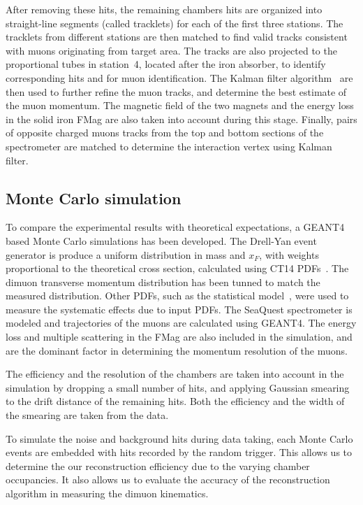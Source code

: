 \documentclass[reprint,aps,unsortedaddress,superscriptaddress,prc,floatfix,showpacs,linenumbers,final]{revtex4-2}
\begin{document}
After removing these hits, the remaining chambers hits are organized into straight-line segments (called tracklets)
for each of the first three stations.
The tracklets from different stations are then matched to find valid tracks consistent with muons 
originating from target area. 
The tracks are also projected to the proportional tubes in station~4, located after the iron absorber,
to identify corresponding hits and for muon identification.
The Kalman filter algorithm~\cite{kalman1960} are then used to further refine the muon tracks,
and determine the best estimate of the muon momentum.
The magnetic field of the two magnets and the energy loss in the solid iron FMag are also taken into account during this stage.
Finally, pairs of opposite charged muons tracks from the top and bottom sections of the spectrometer are
matched to determine the interaction vertex using Kalman filter.

\subsection{Monte Carlo simulation}
\label{subsec:MC}

To compare the experimental results with theoretical expectations,
a GEANT4~\cite{agostinelli2003,allison2006,allison2016} based Monte Carlo simulations has been developed.
The Drell-Yan event generator is produce a uniform distribution in mass and $x_F$,
with weights proportional to the theoretical cross section, calculated using CT14 PDFs~\cite{hou2018}.
The dimuon transverse momentum distribution has been tunned to match the measured distribution.
Other PDFs, such as the statistical model~\cite{soffer2019}, were used to measure the systematic effects due to input PDFs.
The SeaQuest spectrometer is modeled and trajectories of the muons are calculated using GEANT4.
The energy loss and multiple scattering in the FMag are also included in the simulation,
and are the dominant factor in determining the momentum resolution of the muons. 

The efficiency and the resolution of the chambers are taken into account in the simulation
by dropping a small number of hits, and applying Gaussian smearing to the drift distance of the remaining hits.
Both the efficiency and the width of the smearing are taken from the data.

To simulate the noise and background hits during data taking,
each Monte Carlo events are embedded with hits recorded by the random trigger.
This allows us to determine the our reconstruction efficiency due to the varying chamber occupancies.
It also allows us to evaluate the accuracy of the reconstruction algorithm in measuring the dimuon kinematics.
\end{document}
